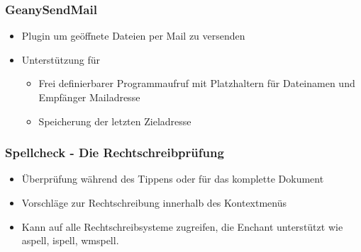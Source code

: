 \begin{frame}
  \frametitle{GeanySendMail}
  \begin{itemize}
  \item Plugin um geöffnete Dateien per Mail zu versenden
  \item Unterstützung für
    \begin{itemize}
    \item Frei definierbarer Programmaufruf mit Platzhaltern für
      Dateinamen und Empfänger Mailadresse
    \item Speicherung der letzten Zieladresse
    \end{itemize}
  \end{itemize}
\end{frame}

\begin{frame}
  \frametitle{Spellcheck - Die Rechtschreibprüfung}
  \begin{block}{}
    \begin{itemize}
    \item Überprüfung während des Tippens oder für das komplette
      Dokument
    \item Vorschläge zur Rechtschreibung innerhalb des Kontextmenüs
    \item Kann auf alle Rechtschreibsysteme zugreifen, die Enchant
      unterstützt wie aspell, ispell, wmspell.
    \end{itemize}
  \end{block}
\end{frame}


